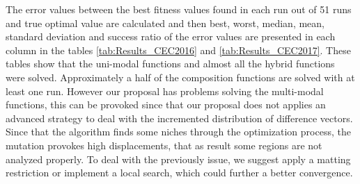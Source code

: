 
The error values between the best fitness values found in each run out of 51 runs and true optimal value are calculated and then best, worst, median, mean, standard deviation and success ratio of the error values are presented in each column in the tables \ref{tab:Results_CEC2016} and \ref{tab:Results_CEC2017}.
%
These tables show that the uni-modal functions and almost all the hybrid functions were solved.
%
Approximately a half of the composition functions are solved with at least one run.
%
However our proposal has problems solving the multi-modal functions, this can be provoked since that our proposal does not applies an advanced strategy to deal with the incremented distribution of difference vectors.
%
Since that the algorithm finds some niches through the optimization process, the mutation provokes high displacements, that as result some regions are not analyzed properly.
%
To deal with the previously issue, we suggest apply a matting restriction or implement a local search, which could further a better convergence.

